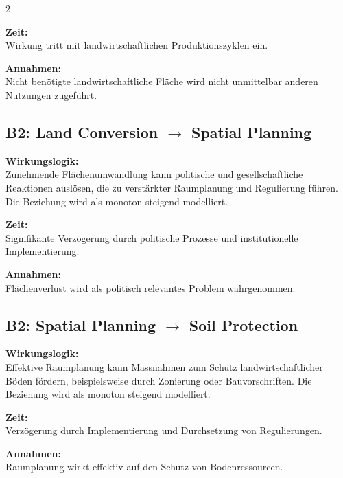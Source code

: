 \documentclass[10pt, a4paper]{article}
\begin{document}
\begin{multicols}{2}
\begin{minipage}{\linewidth}
\textbf{Zeit:}\\
Wirkung tritt mit landwirtschaftlichen Produktionszyklen ein.

\textbf{Annahmen:}\\
Nicht benötigte landwirtschaftliche Fläche wird nicht unmittelbar anderen Nutzungen zugeführt.
\end{minipage}\vspace{1em}

\begin{minipage}{\linewidth}
\subsection*{B2: Land Conversion $\rightarrow$ Spatial Planning}

\textbf{Wirkungslogik:}\\
Zunehmende Flächenumwandlung kann politische und gesellschaftliche Reaktionen auslösen, die zu verstärkter Raumplanung und Regulierung führen.
Die Beziehung wird als monoton steigend modelliert.

\textbf{Zeit:}\\
Signifikante Verzögerung durch politische Prozesse und institutionelle Implementierung.

\textbf{Annahmen:}\\
Flächenverlust wird als politisch relevantes Problem wahrgenommen.
\end{minipage}\vspace{1em}

\begin{minipage}{\linewidth}
\subsection*{B2: Spatial Planning $\rightarrow$ Soil Protection}

\textbf{Wirkungslogik:}\\
Effektive Raumplanung kann Massnahmen zum Schutz landwirtschaftlicher Böden fördern, beispielsweise durch Zonierung oder Bauvorschriften.
Die Beziehung wird als monoton steigend modelliert.

\textbf{Zeit:}\\
Verzögerung durch Implementierung und Durchsetzung von Regulierungen.

\textbf{Annahmen:}\\
Raumplanung wirkt effektiv auf den Schutz von Bodenressourcen.
\end{minipage}\vspace{1em}


\end{multicols}
\end{document}
